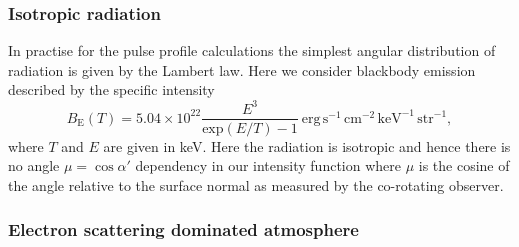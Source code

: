 \documentclass[iop, usenatbib]{emulateapj}
\begin{document}
\subsubsection{Isotropic radiation}

In practise for the pulse profile calculations the simplest angular distribution of radiation is given by the Lambert law.
Here we consider blackbody emission described by the specific intensity
\begin{equation}
  B_{\mathrm{E}}(T) = 5.04 \times 10^{22} \frac{E^3}{\mathrm{exp}(E/T) -1}~\mathrm{erg}\,\mathrm{s}^{-1}\,\mathrm{cm}^{-2}\,\mathrm{keV}^{-1}\,\mathrm{str}^{-1},
\end{equation}
where $T$ and $E$ are given in keV.
Here the radiation is isotropic and hence there is no angle $\mu = \cos\alpha'$ dependency in our intensity function where $\mu$ is the cosine of the angle relative to the surface normal as measured by the co-rotating observer.

\subsubsection{Electron scattering dominated atmosphere}
\end{document}
